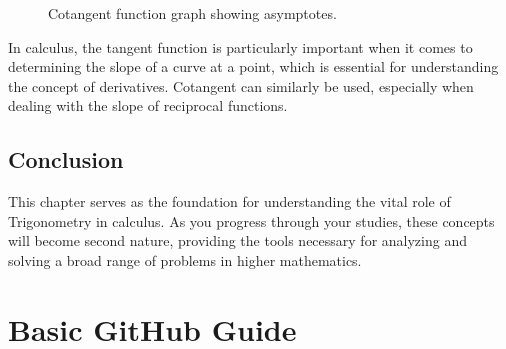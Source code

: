 \documentclass[a4paper,12pt]{book}
\begin{document}
\begin{figure}[h]
\centering
{}
\caption{Cotangent function graph showing asymptotes.}
\end{figure}

In calculus, the tangent function is particularly important when it comes to determining the slope of a curve at a point, which is essential for understanding the concept of derivatives. Cotangent can similarly be used, especially when dealing with the slope of reciprocal functions.



\section*{Conclusion}
\label{sec:trig_conclusion}
This chapter serves as the foundation for understanding the vital role of Trigonometry in calculus. As you progress through your studies, these concepts will become second nature, providing the tools necessary for analyzing and solving a broad range of problems in higher mathematics.






\clearpage
{}
\appendix
\renewcommand{\thechapter}{\Roman{chapter}} %

\chapter{Basic GitHub Guide}
\end{document}
